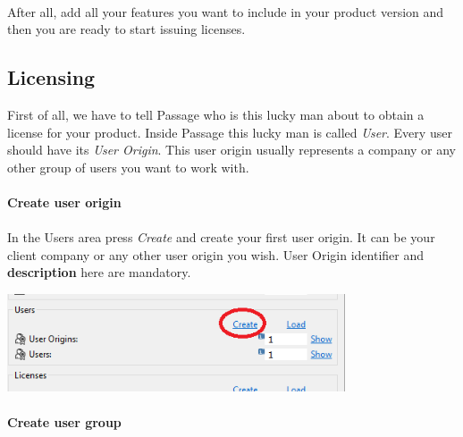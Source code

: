 \documentclass[12pt]{report}
\begin{document}
\paragraph*{}

After all, add all your features you want to include in your product version and then you are ready to start issuing licenses.

\subsection*{Licensing}

First of all, we have to tell Passage who is this lucky man about to obtain a license for your product. Inside Passage this lucky man is called \textit{User}. 
Every user should have its \textit{User Origin}. This user origin usually represents a company or any other group of users you want to work with.

\paragraph*{Create user origin}
\paragraph*{}

In the Users area press \textit{Create} and create your first user origin. It can be your client company or any other user origin you wish.
User Origin identifier and \textbf{description} here are mandatory.

\begin{center}
    \includegraphics[width=0.75\textwidth]{user_origin_create}
\end{center}

\paragraph*{Create user group}
\paragraph*{}
\end{document}
